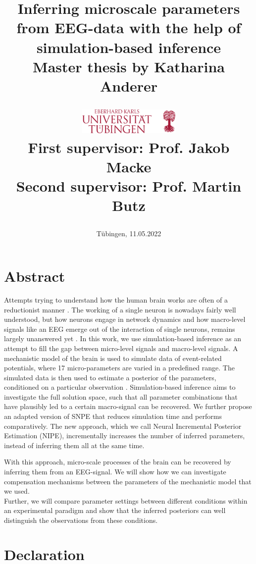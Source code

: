 \documentclass[12pt]{extreport}
\title{
Inferring microscale parameters from EEG-data with the help of simulation-based inference\\
\vspace{50px}
{\large Master thesis by Katharina Anderer}
\vspace{60px}

\hspace{10px}\includegraphics[width=50mm,scale=0.5]{images/UniversitaetTuebingen.png}\\
\vspace{50px}
{\large First supervisor: Prof. Jakob Macke}\\
{\large Second supervisor: Prof. Martin Butz}
}
\author{}
\date{Tübingen, 11.05.2022}
\begin{document}
\maketitle



\chapter*{Abstract}
Attempts trying to understand how the human brain works are often of a reductionist manner \citep{einevoll2019scientific}. The working of a single neuron is nowadays fairly well understood, but how neurons engage in network dynamics and how macro-level signals like an EEG emerge out of the interaction of single neurons, remains largely unanswered yet \citep{einevoll2019scientific}.
In this work, we use simulation-based inference \citep{cranmer2020frontier, greenberg_automatic_2019, goncalves2018flexible} as an attempt to fill the gap between micro-level signals and macro-level signals.
A mechanistic model of the brain is used to simulate data of event-related potentials, where 17 micro-parameters are varied in a predefined range. The simulated data is then used to estimate a posterior of the parameters, conditioned on a particular observation \citep{greenberg_automatic_2019}. Simulation-based inference aims to investigate the full solution space, such that all parameter combinations that have plausibly led to a certain macro-signal can be recovered. We further propose an adapted version of SNPE \citep{greenberg_automatic_2019} that reduces simulation time and performs comparatively. The new approach, which we call Neural Incremental Posterior Estimation (NIPE), incrementally increases the number of inferred parameters, instead of inferring them all at the same time. 

With this approach, micro-scale processes of the brain can be recovered by inferring them from an EEG-signal. We will show how we can investigate compensation mechanisms between the parameters of the mechanistic model that we used.\\
Further, we will compare parameter settings between different conditions within an experimental paradigm and show that the inferred posteriors can well distinguish the observations from these conditions. 


\chapter*{Declaration}
\end{document}
